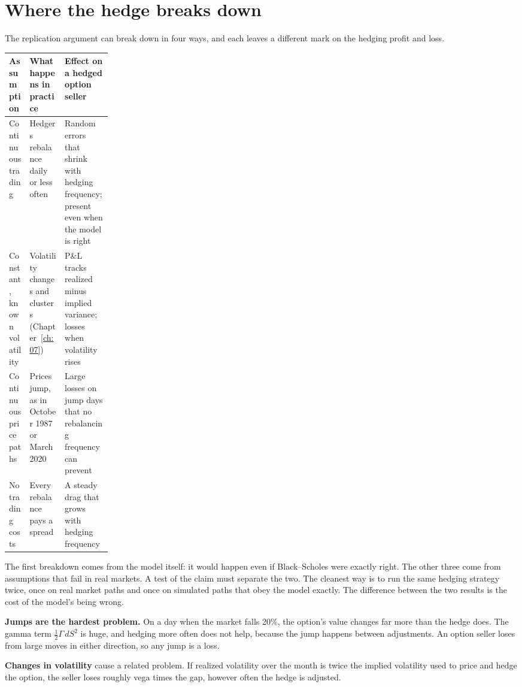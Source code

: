 \section{Where the hedge breaks down}
\label{sec:14-how}

The replication argument can break down in four ways, and each leaves a different mark on the hedging profit and loss.

\begin{center}
\small
\begin{tabularx}{0.9\linewidth}{@{}>{\raggedright\arraybackslash}p{0.2\linewidth}>{\raggedright\arraybackslash}X>{\raggedright\arraybackslash}X@{}}
\toprule
Assumption & What happens in practice & Effect on a hedged option seller \\
\midrule
Continuous trading & Hedgers rebalance daily or less often & Random errors that shrink with hedging frequency; present even when the model is right \\
Constant, known volatility & Volatility changes and clusters (Chapter~\ref{ch:07}) & P\&L tracks realized minus implied variance; losses when volatility rises \\
Continuous price paths & Prices jump, as in October 1987 or March 2020 & Large losses on jump days that no rebalancing frequency can prevent \\
No trading costs & Every rebalance pays a spread & A steady drag that grows with hedging frequency \\
\bottomrule
\end{tabularx}
\end{center}

The first breakdown comes from the model itself: it would happen even if Black--Scholes were exactly right. The other three come from assumptions that fail in real markets. A test of the claim must separate the two. The cleanest way is to run the same hedging strategy twice, once on real market paths and once on simulated paths that obey the model exactly. The difference between the two results is the cost of the model's being wrong.

\textbf{Jumps are the hardest problem.} On a day when the market falls 20\%, the option's value changes far more than the hedge does. The gamma term $\tfrac{1}{2}\Gamma\,dS^2$ is huge, and hedging more often does not help, because the jump happens between adjustments. An option seller loses from large moves in either direction, so any jump is a loss.

\textbf{Changes in volatility} cause a related problem. If realized volatility over the month is twice the implied volatility used to price and hedge the option, the seller loses roughly vega times the gap, however often the hedge is adjusted.

